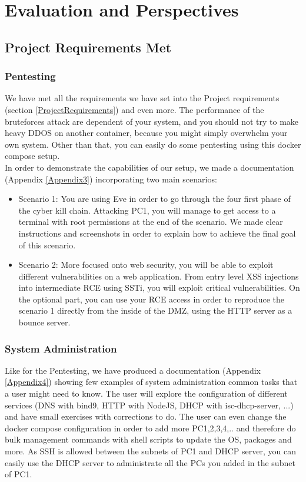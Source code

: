 \documentclass[a4paper,11pt,singlespacing]{article}
\begin{document}
\section{Evaluation and Perspectives}

\subsection{Project Requirements Met}

\subsubsection{Pentesting}
We have met all the requirements we have set into the Project requirements (section \ref{ProjectRequirements}) and even more. The performance of the bruteforces attack are dependent of your system, and you should not try to make heavy DDOS on another container, because you might simply overwhelm your own system. Other than that, you can easily do some pentesting using this docker compose setup.\\

In order to demonstrate the capabilities of our setup, we made a documentation (Appendix \ref{Appendix3}) incorporating two main scenarios:
\begin{itemize}
    \item Scenario 1: You are using Eve in order to go through the four first phase of the cyber kill chain. Attacking PC1, you will manage to get access to a terminal with root permissions at the end of the scenario. We made clear instructions and screenshots in order to explain how to achieve the final goal of this scenario.
    \item Scenario 2: More focused onto web security, you will be able to exploit different vulnerabilities on a web application. From entry level XSS injections into intermediate RCE using SSTi, you will exploit critical vulnerabilities. On the optional part, you can use your RCE access in order to reproduce the scenario 1 directly from the inside of the DMZ, using the HTTP server as a bounce server. 
\end{itemize}

\subsubsection{System Administration}
Like for the Pentesting, we have produced a documentation (Appendix \ref{Appendix4}) showing few examples of system administration common tasks that a user might need to know. The user will explore the configuration of different services (DNS with bind9, HTTP with NodeJS, DHCP with isc-dhcp-server, ...) and have small exercises with corrections to do. The user can even change the docker compose configuration in order to add more PC1,2,3,4,.. and therefore do bulk management commands with shell scripts to update the OS, packages and more. As SSH is allowed between the subnets of PC1 and DHCP server, you can easily use the DHCP server to administrate all the PCs you added in the subnet of PC1.\\
\end{document}
